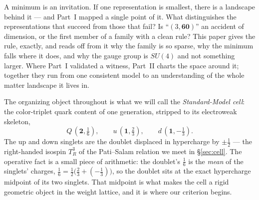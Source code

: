 \documentclass[11pt,a4paper]{article}
\begin{document}
A minimum is an invitation. If one representation is smallest, there is a landscape behind
it --- and Part~I mapped a single point of it. What distinguishes the representations that
succeed from those that fail? Is ``$(3,\mathbf{60})$'' an accident of dimension, or the
first member of a family with a clean rule? This paper gives the rule, exactly, and reads
off from it why the family is so sparse, why the minimum falls where it does, and why the
gauge group is $SU(4)$ and not something larger. Where Part~I validated a witness, Part~II
charts the space around it; together they run from one consistent model to an understanding
of the whole matter landscape it lives in.

The organizing object throughout is what we will call the \emph{Standard-Model cell}: the
color-triplet quark content of one generation, stripped to its electroweak skeleton,
\[
Q\,(\mathbf{2},\tfrac16),\qquad u\,(\mathbf{1},\tfrac23),\qquad d\,(\mathbf{1},-\tfrac13).
\]
The up and down singlets are the doublet displaced in hypercharge by $\pm\tfrac12$ --- the
right-handed isospin $T^3_R$ of the Pati--Salam relation we meet in \S\ref{sec:cell}. The
operative fact is a small piece of arithmetic: the doublet's $\tfrac16$ is the \emph{mean}
of the singlets' charges, $\tfrac16=\tfrac12\!\big(\tfrac23+(-\tfrac13)\big)$, so the
doublet sits at the exact hypercharge midpoint of its two singlets. That midpoint is what
makes the cell a rigid geometric object in the weight lattice, and it is where our criterion
begins.
\end{document}
